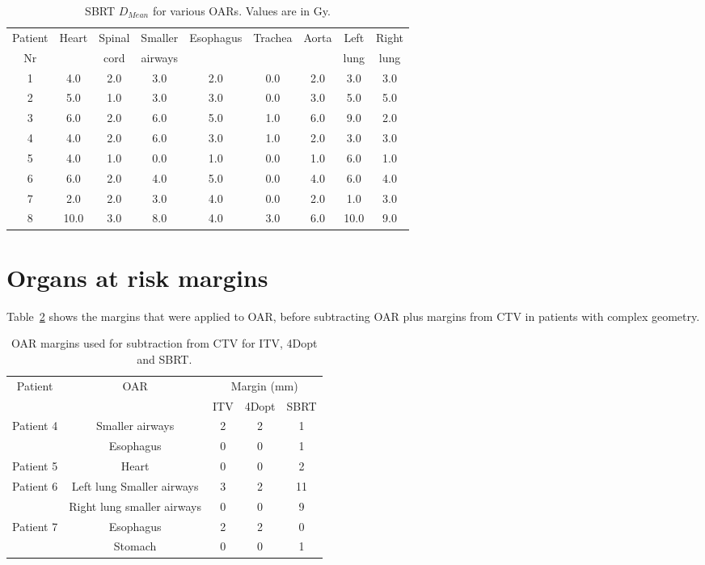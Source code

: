 \begin{table}[H]
  \centering
  \caption{SBRT $D_{Mean}$ for various OARs. Values are in Gy.}
  \begin{tabular}{c|c|c|c|c|c|c|c|c}
   Patient & \multirow{2}{*}{Heart} & Spinal  & Smaller  & \multirow{2}{*}{Esophagus} & \multirow{2}{*}{Trachea} & \multirow{2}{*}{Aorta} & Left  & Right \\
   Nr & & cord & airways & & & & lung & lung \\
 \hline\hline 
1 & 4.0 & 2.0 & 3.0 & 2.0 & 0.0 & 2.0 & 3.0 & 3.0 \\ 
2 & 5.0 & 1.0 & 3.0 & 3.0 & 0.0 & 3.0 & 5.0 & 5.0 \\ 
3 & 6.0 & 2.0 & 6.0 & 5.0 & 1.0 & 6.0 & 9.0 & 2.0 \\ 
4 & 4.0 & 2.0 & 6.0 & 3.0 & 1.0 & 2.0 & 3.0 & 3.0 \\ 
5 & 4.0 & 1.0 & 0.0 & 1.0 & 0.0 & 1.0 & 6.0 & 1.0 \\ 
6 & 6.0 & 2.0 & 4.0 & 5.0 & 0.0 & 4.0 & 6.0 & 4.0 \\ 
7 & 2.0 & 2.0 & 3.0 & 4.0 & 0.0 & 2.0 & 1.0 & 3.0 \\ 
8 & 10.0 & 3.0 & 8.0 & 4.0 & 3.0 & 6.0 & 10.0 & 9.0 \\ 
\hline\hline
  \end{tabular}
  \label{tab:oarlimits1}
\end{table}

\section{Organs at risk margins}

Table~\ref{tab:oarmargins} shows the margins that were applied to OAR, before subtracting OAR plus margins from CTV in patients with complex geometry.

\begin{table}[H]
  \centering
  \caption{OAR margins used for subtraction from CTV for ITV, 4Dopt and SBRT.}
  \begin{tabular}{c|c|c|c|c}
\multirow{2}{*}{Patient} & \multirow{2}{*}{OAR} & \multicolumn{3}{|c}{Margin (mm)} \\
& &  ITV & 4Dopt & SBRT\\
   \hline\hline

   \multirow{2}{*}{Patient 4} & Smaller airways & 2 & 2 & 1 \\
    & Esophagus & 0 & 0 & 1 \\ \hline
    Patient 5 & Heart & 0 & 0 & 2 \\ \hline
    \multirow{2}{*}{Patient 6} & Left lung Smaller airways & 3 & 2 & 11 \\
    & Right lung smaller airways & 0 & 0 & 9 \\ \hline
    \multirow{2}{*}{Patient 7} & Esophagus & 2 & 2 & 0 \\
    & Stomach & 0 & 0 & 1\\
    
\hline\hline
  
  \end{tabular}
  \label{tab:oarmargins}
\end{table}
